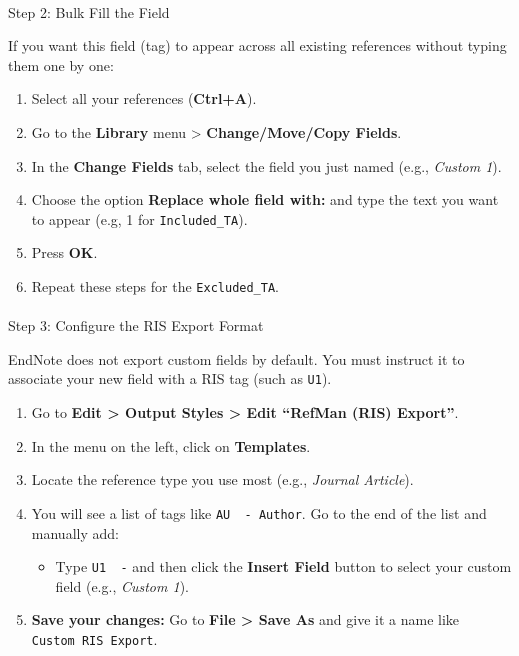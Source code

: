 \documentclass[
  letterpaper,
  DIV=11,
  numbers=noendperiod]{scrartcl}
\makeatletter
\let\oldparagraph\paragraph
\renewcommand{\paragraph}{
    \@ifstar
      \xxxParagraphStar
      \xxxParagraphNoStar
  }
\newcommand{\xxxParagraphStar}[1]{\oldparagraph*{#1}\mbox{}}
\newcommand{\xxxParagraphNoStar}[1]{\oldparagraph{#1}\mbox{}}
\providecommand{\tightlist}{%
  \setlength{\itemsep}{0pt}\setlength{\parskip}{0pt}}
\makeatother
\begin{document}
\paragraph{Step 2: Bulk Fill the
Field}\label{step-2-bulk-fill-the-field}

If you want this field (tag) to appear across all existing references
without typing them one by one:

\begin{enumerate}
\def\labelenumi{\arabic{enumi}.}
\item
  Select all your references (\textbf{Ctrl+A}).
\item
  Go to the \textbf{Library} menu \textgreater{}
  \textbf{Change/Move/Copy Fields}.
\item
  In the \textbf{Change Fields} tab, select the field you just named
  (e.g., \emph{Custom 1}).
\item
  Choose the option \textbf{Replace whole field with:} and type the text
  you want to appear (e.g, 1 for \texttt{Included\_TA}).
\item
  Press \textbf{OK}.
\item
  Repeat these steps for the \texttt{Excluded\_TA}.
\end{enumerate}

\paragraph{Step 3: Configure the RIS Export
Format}\label{step-3-configure-the-ris-export-format}

EndNote does not export custom fields by default. You must instruct it
to associate your new field with a RIS tag (such as \texttt{U1}).

\begin{enumerate}
\def\labelenumi{\arabic{enumi}.}
\item
  Go to \textbf{Edit \textgreater{} Output Styles \textgreater{} Edit
  ``RefMan (RIS) Export''}.
\item
  In the menu on the left, click on \textbf{Templates}.
\item
  Locate the reference type you use most (e.g., \emph{Journal Article}).
\item
  You will see a list of tags like \texttt{AU\ \ -\ Author}. Go to the
  end of the list and manually add:

  \begin{itemize}
  \tightlist
  \item
    Type \texttt{U1\ \ -} and then click the \textbf{Insert Field}
    button to select your custom field (e.g., \emph{Custom 1}).
  \end{itemize}
\item
  \textbf{Save your changes:} Go to \textbf{File \textgreater{} Save As}
  and give it a name like \texttt{Custom\ RIS\ Export}.
\end{enumerate}
\end{document}
